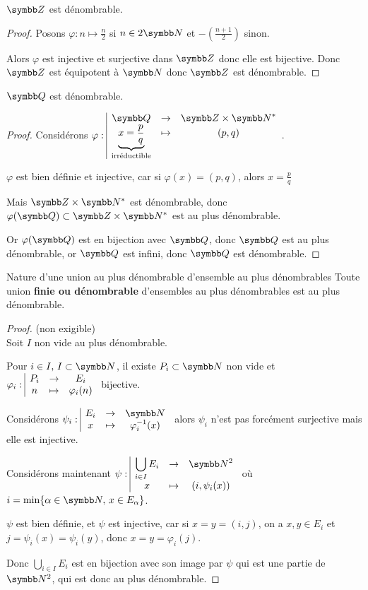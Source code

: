 \begin{theoreme}{}{}
    $\Z$ est dénombrable.
\end{theoreme}

\begin{proof}
Posons $\varphi : n \mapsto \frac n 2$ si $n \in 2 \N$ et $-\left(\frac {n+1} 2\right)$ sinon.

Alors $\varphi$ est injective et surjective dans $\Z$ donc elle est bijective.
Donc $\Z$ est équipotent à $\N$ donc $\Z$ est dénombrable.
\end{proof}

\begin{theoreme}{}{}
    $\Q$ est dénombrable. 
\end{theoreme}


\begin{proof}
    Considérons $\fonction \varphi \Q {\Z \times \N^*}{\underbrace{ x = \frac p q}_{\text{irréductible}} } {(p, q)}$.

    $\varphi$ est bien définie et injective, car si $\varphi(x) = (p, q)$, alors $x = \frac p q$

    Mais $\Z \times \N^*$ est dénombrable, donc $\varphi(\Q) \subset \Z \times \N^*$ est 
    au plus dénombrable. 

    Or $\varphi(\Q)$ est en bijection avec $\Q$, donc $\Q$ est au plus dénombrable, or $\Q$ est 
    infini, donc $\Q$ est dénombrable.
\end{proof}

\begin{theoreme}{Nature d'une union au plus dénombrable d'ensemble au plus dénombrables}{}
    Toute union \textbf{finie ou dénombrable} d'ensembles au plus dénombrables est au plus dénombrable. 
\end{theoreme}

\begin{proof} (non exigible)\\
    Soit $I$ non vide au plus dénombrable.
    
    Pour $i \in I, \, I \subset \N$, il existe $P_i \subset \N$ non vide et $\varphi_i: \space \begin{array}{|ccc} \displaystyle P_i & \to & \displaystyle E_i \\ \displaystyle n & \mapsto & \displaystyle \varphi_i(n)  \end{array}$ bijective. 

    Considérons $\fonction {\psi_i} {E_i} \N x {\varphi_i^{-1}(x)}$ alors $\psi_i$ n'est pas forcément 
    surjective mais elle est injective. 

    Considérons maintenant $\fonction {\psi} {\bigcup_{i \in I} E_i} {\N^2} x {(i, \psi_i(x))}$ où $i = \min \{ \alpha \in \N, \, x \in E_\alpha \}$.

    $\psi$ est bien définie, et $\psi$ est injective, car si $x = y = (i, j)$, 
    on a $x, y \in E_i$ et $j = \psi_i(x) = \psi_i(y)$, donc $x = y = \varphi_i(j)$.

    Donc $\displaystyle \bigcup_{i \in I} E_i$ est en bijection avec son image par $\psi$
    qui est une partie de $\N^2$, qui est donc au plus dénombrable.
\end{proof}

